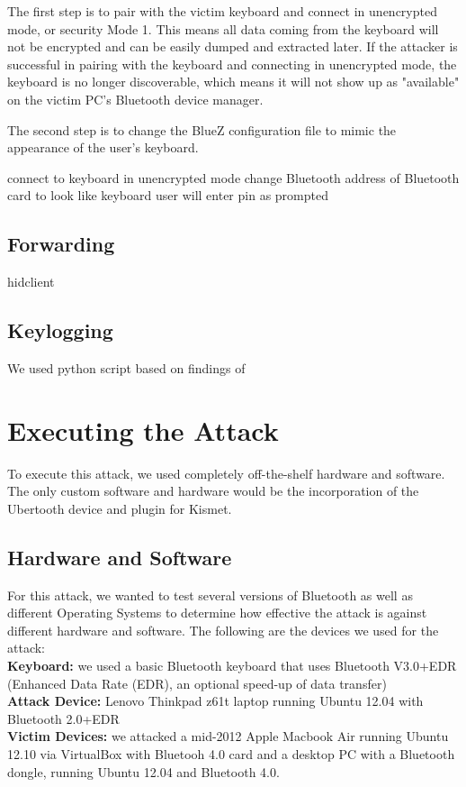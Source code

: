 \documentclass{acm_proc_article-sp}
\begin{document}
The first step is to pair with the victim keyboard and connect in unencrypted mode, or security Mode 1. This means all data coming from the keyboard will not be encrypted and can be easily dumped and extracted later. If the attacker is successful in pairing with the keyboard and connecting in unencrypted mode, the keyboard is no longer discoverable, which means it will not show up as "available" on the victim PC's Bluetooth device manager. 

The second step is to change the BlueZ configuration file to mimic the appearance of the user's keyboard. 

connect to keyboard in unencrypted mode
change Bluetooth address of Bluetooth card to look like keyboard 
user will enter pin as prompted

\subsection{Forwarding}
hidclient \cite{hidclient}
\subsection{Keylogging}
We used python script based on findings of \cite{chopper}


\section{Executing the Attack}
To execute this attack, we used completely off-the-shelf hardware and software. The only custom software and hardware would be the incorporation of the Ubertooth device and plugin for Kismet. 


\subsection{Hardware and Software}
For this attack, we wanted to test several versions of Bluetooth as well as different Operating Systems to determine how effective the attack is against different hardware and software. The following are the devices we used for the attack:\\
\textbf{Keyboard:} we used a basic Bluetooth keyboard that uses Bluetooth V3.0+EDR (Enhanced Data Rate (EDR), an optional speed-up of data transfer)\\
\textbf{Attack Device:} Lenovo Thinkpad z61t laptop running Ubuntu 12.04 with Bluetooth 2.0+EDR\\
\textbf{Victim Devices:} we attacked a mid-2012 Apple Macbook Air running Ubuntu 12.10 via VirtualBox with
Bluetooh 4.0 card and a desktop PC with a Bluetooth dongle, running Ubuntu 12.04 and Bluetooth 4.0.
\end{document}
